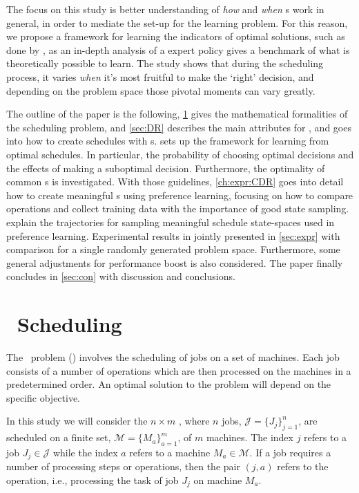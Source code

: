\documentclass[smallextended]{svjour3}
\begin{document}
The focus on this study is better understanding of \emph{how} and \emph{when} 
\dr s work in general, in order to mediate the set-up for the 
learning problem.
For this reason, we propose a framework for learning the indicators of optimal 
solutions, such as done by \cite{Siggi10}, as an in-depth analysis of a expert 
policy gives a benchmark of what is theoretically possible to learn. 
The study shows that during the scheduling process, it varies \emph{when} it's 
most fruitful to make the `right' decision, and depending on the problem space 
those pivotal moments can vary greatly. 

The outline of the paper is the following, \cref{sec:problemdef} gives the 
mathematical formalities of the scheduling problem, and  
\cref{sec:DR} describes the main attributes for \jsp, 
and goes into how to create schedules with \dr s. 
 sets up the framework for learning from optimal schedules. 
In particular, the probability of choosing optimal decisions and the effects of 
making a suboptimal decision. Furthermore, the optimality of common \sdr s is 
investigated.
With those guidelines, \cref{ch:expr:CDR} goes into detail how to create 
meaningful \cdr s using preference learning, focusing on how to 
compare operations and collect training data with the importance of good state 
sampling. 
 explain the trajectories for 
sampling meaningful schedule state-spaces used in preference learning. 
Experimental results in jointly presented in \cref{sec:expr} with comparison 
for a single randomly generated problem space. Furthermore, some general 
adjustments for performance boost is also considered.
The paper finally concludes in \cref{sec:con} with discussion and conclusions.


\section{\Jsp~Scheduling}\label{sec:problemdef}
The \jsp~problem (\JSP) involves the scheduling of jobs on a set of 
machines. Each job consists of a number of operations which are then processed 
on the machines in a predetermined order. An optimal solution to the problem 
will depend on the specific objective. 

In this study we will consider the $n\times m$ \JSP, where $n$ jobs, 
$\mathcal{J}=\{J_j\}_{j=1}^n$, are scheduled on a finite set, 
$\mathcal{M}=\{M_a\}_{a=1}^m$, of $m$ machines. The index $j$ refers to a job 
$J_j\in\mathcal{J}$ while the index  $a$ refers to a machine 
$M_a\in\mathcal{M}$. 
If a job requires a number of processing steps or operations, then the pair 
$(j,a)$ refers to the operation, i.e., processing the task of job $J_j$ on 
machine $M_a$. 
\end{document}
